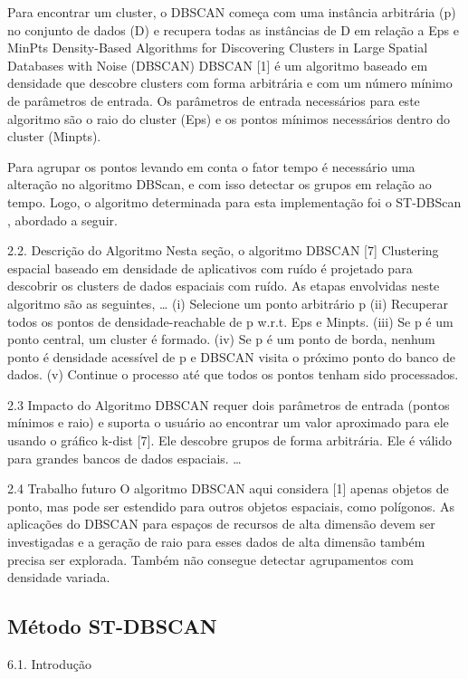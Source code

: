 Para encontrar um cluster, o DBSCAN começa com uma instância arbitrária (p) no conjunto de dados (D) e recupera todas as instâncias de D em relação a Eps e MinPts
Density-Based Algorithms for Discovering Clusters in Large Spatial Databases with Noise (DBSCAN)
DBSCAN [1] é um algoritmo baseado em densidade que descobre clusters com forma arbitrária e com um número mínimo de parâmetros de entrada. Os parâmetros de entrada necessários para este algoritmo são o raio do cluster (Eps) e os pontos mínimos necessários dentro do cluster (Minpts).

Para agrupar os pontos levando em conta o fator tempo é necessário uma alteração no algoritmo DBScan, e com isso detectar os grupos em relação ao tempo. Logo, o algoritmo determinada para esta implementação foi o ST-DBScan \cite{Birant2007STDBSCANAA}, abordado a seguir.

2.2. Descrição do Algoritmo
Nesta seção, o algoritmo DBSCAN [7] Clustering espacial baseado em densidade de aplicativos com ruído é projetado para descobrir os clusters de dados espaciais com ruído. As etapas envolvidas neste algoritmo são as seguintes,
…
(i) Selecione um ponto arbitrário p
(ii) Recuperar todos os pontos de densidade-reachable de p w.r.t. Eps e Minpts.
(iii) Se p é um ponto central, um cluster é formado.
(iv) Se p é um ponto de borda, nenhum ponto é densidade acessível de p e DBSCAN visita o próximo ponto do banco de dados.
(v) Continue o processo até que todos os pontos tenham sido processados.

2.3 Impacto do Algoritmo
DBSCAN requer dois parâmetros de entrada (pontos mínimos e raio) e suporta o usuário ao encontrar um valor aproximado para ele usando o gráfico k-dist [7]. Ele descobre grupos de forma arbitrária. Ele é válido para grandes bancos de dados espaciais.
…

2.4 Trabalho futuro
O algoritmo DBSCAN aqui considera [1] apenas objetos de ponto, mas pode ser estendido para outros objetos espaciais, como polígonos. As aplicações do DBSCAN para espaços de recursos de alta dimensão devem ser investigadas e a geração de raio para esses dados de alta dimensão também precisa ser explorada. Também não consegue detectar agrupamentos com densidade variada.


\subsection{Método ST-DBSCAN}

6.1. Introdução

